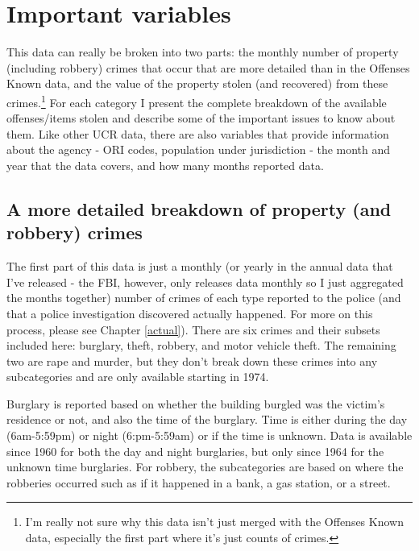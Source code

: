 \documentclass[
  12pt,
  openany]{book}
\begin{document}
\hypertarget{important-variables-4}{%
\section{Important variables}\label{important-variables-4}}

This data can really be broken into two parts: the monthly number of property (including robbery) crimes that occur that are more detailed than in the Offenses Known data, and the value of the property stolen (and recovered) from these crimes.\footnote{I'm really not sure why this data isn't just merged with the Offenses Known data, especially the first part where it's just counts of crimes.} For each category I present the complete breakdown of the available offenses/items stolen and describe some of the important issues to know about them. Like other UCR data, there are also variables that provide information about the agency - ORI codes, population under jurisdiction - the month and year that the data covers, and how many months reported data.

\hypertarget{propertycount}{%
\subsection{A more detailed breakdown of property (and robbery) crimes}\label{propertycount}}

The first part of this data is just a monthly (or yearly in the annual data that I've released - the FBI, however, only releases data monthly so I just aggregated the months together) number of crimes of each type reported to the police (and that a police investigation discovered actually happened. For more on this process, please see Chapter \ref{actual}). There are six crimes and their subsets included here: burglary, theft, robbery, and motor vehicle theft. The remaining two are rape and murder, but they don't break down these crimes into any subcategories and are only available starting in 1974.

Burglary is reported based on whether the building burgled was the victim's residence or not, and also the time of the burglary. Time is either during the day (6am-5:59pm) or night (6:pm-5:59am) or if the time is unknown. Data is available since 1960 for both the day and night burglaries, but only since 1964 for the unknown time burglaries. For robbery, the subcategories are based on where the robberies occurred such as if it happened in a bank, a gas station, or a street.
\end{document}
